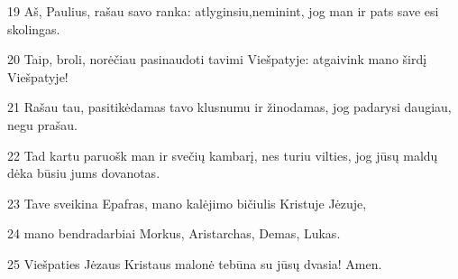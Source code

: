 \par 19 Aš, Paulius, rašau savo ranka: atlyginsiu,­neminint, jog man ir pats save esi skolingas. 
\par 20 Taip, broli, norėčiau pasinaudoti tavimi Viešpatyje: atgaivink mano širdį Viešpatyje! 
\par 21 Rašau tau, pasitikėdamas tavo klusnumu ir žinodamas, jog padarysi daugiau, negu prašau. 
\par 22 Tad kartu paruošk man ir svečių kambarį, nes turiu vilties, jog jūsų maldų dėka būsiu jums dovanotas. 
\par 23 Tave sveikina Epafras, mano kalėjimo bičiulis Kristuje Jėzuje, 
\par 24 mano bendradarbiai Morkus, Aristarchas, Demas, Lukas. 
\par 25 Viešpaties Jėzaus Kristaus malonė tebūna su jūsų dvasia! Amen.

